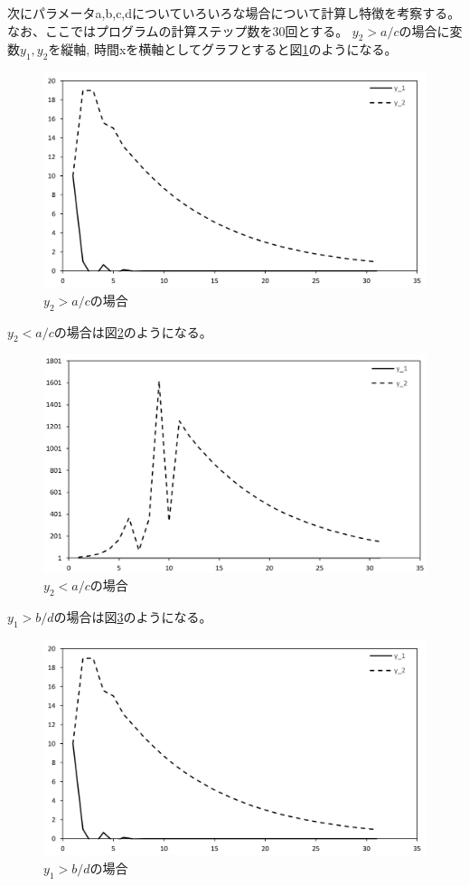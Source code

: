 \documentclass[11pt,titlepage]{jsarticle}
\begin{document}
次にパラメータa,b,c,dについていろいろな場合について計算し特徴を考察する。
なお、ここではプログラムの計算ステップ数を30回とする。
$y_2 > a/c$の場合に変数$y_1, y_2$を縦軸, 時間xを横軸としてグラフとすると図\ref{fig:y2>a/c}のようになる。

\begin{figure}[H]
\centering
\includegraphics[width=12cm]{img/y2big_ac.png}
\caption{$y_2 > a/c$の場合}
\label{fig:y2>a/c}
\end{figure}

$y_2 < a/c$の場合は図\ref{fig:y2<a/c}のようになる。
\begin{figure}[H]
\centering
\includegraphics[width=12cm]{img/y2small_ac.png}
\caption{$y_2 < a/c$の場合}
\label{fig:y2<a/c}
\end{figure}

$y_1 > b/d$の場合は図\ref{fig:y1>b/d}のようになる。
\begin{figure}[H]
\centering
\includegraphics[width=12cm]{img/y2big_ac.png}
\caption{$y_1 > b/d$の場合}
\label{fig:y1>b/d}
\end{figure}
\end{document}
